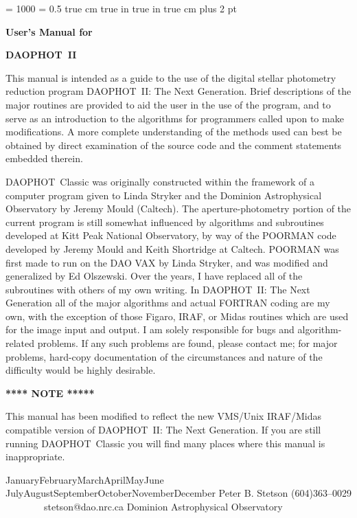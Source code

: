 \def\today{\number\year\space \ifcase\month\or
  January\or February\or March\or April\or May\or June\or
  July\or August\or September\or October\or November\or December\fi
  \space\number\day}
\magnification = 1000
\baselineskip = 0.5 true cm
 true in
 true in
 true cm
\parskip=3pt plus 2 pt
\tenrm
\centerline{}
\vfill
\centerline {\bf User's Manual for}
\centerline {\bf DAOPHOT~II}
\bigskip
\bigskip

This manual is intended as a guide to the use of the digital stellar
photometry reduction program DAOPHOT~II: The Next Generation.  Brief
descriptions of the major routines are provided to aid the user in the
use of the program, and to serve as an introduction to the algorithms
for programmers called upon to make modifications.  A more complete
understanding of the methods used can best be obtained by direct
examination of the source code and the comment statements embedded
therein.

DAOPHOT~Classic was originally constructed within the framework of a
computer program given to Linda Stryker and the Dominion Astrophysical
Observatory by Jeremy Mould (Caltech).  The aperture-photometry portion
of the current program is still somewhat influenced by algorithms and
subroutines developed at Kitt Peak National Observatory, by way of the
POORMAN code developed by Jeremy Mould and Keith Shortridge at Caltech.
POORMAN was first made to run on the DAO VAX by Linda Stryker, and was
modified and generalized by Ed Olszewski.  Over the years, I have
replaced all of the subroutines with others of my own writing. In
DAOPHOT~II: The Next Generation all of the major algorithms and actual
FORTRAN coding are my own, with the exception of those Figaro, IRAF, or
Midas routines which are used for the image input and output.  I am
solely responsible for bugs and algorithm-related problems.  If any
such problems are found, please contact me; for major problems,
hard-copy documentation of the circumstances and nature of the
difficulty would be highly desirable.

\bigskip
\bigskip

\centerline{\bf ***** NOTE *****}

This manual has been modified to reflect the new VMS/Unix IRAF/Midas
compatible version of DAOPHOT~II: The Next Generation.  If you are
still running DAOPHOT~Classic you will find many places where this
manual is inappropriate.

\vfill
\indent \today
\vfill
\indent Peter B. Stetson
\bigskip
(604)363--0029$\qquad\qquad$stetson@dao.nrc.ca
\medskip
\indent Dominion Astrophysical Observatory

